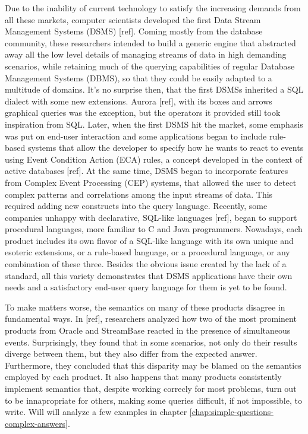 \documentclass{report}
\begin{document}
Due to the inability of current technology to satisfy the increasing
demands from all these markets, computer scientists developed the
first Data Stream Management Systems (DSMS) [ref]. Coming mostly from
the database community, these researchers intended to build a generic
engine that abstracted away all the low level details of managing
streams of data in high demanding scenarios, while retaining much of
the querying capabilities of regular Database Management Systems
(DBMS), so that they could be easily adapted to a multitude of
domains. It's no surprise then, that the first DSMSs inherited a SQL
dialect with some new extensions. Aurora [ref], with its boxes and
arrows graphical queries was the exception, but the operators it
provided still took inspiration from SQL. Later, when the first DSMS
hit the market, some emphasis was put on end-user interaction and some
applications began to include rule-based systems that allow the
developer to specify how he wants to react to events using Event
Condition Action (ECA) rules, a concept developed in the context of
active databases [ref]. At the same time, DSMS began to incorporate
features from Complex Event Processing (CEP) systems, that allowed the
user to detect complex patterns and correlations among the input
streams of data. This required adding new constructs into the query
language. Recently, some companies unhappy with declarative, SQL-like
languages [ref], began to support procedural languages, more familiar
to C and Java programmers. Nowadays, each product includes its own
flavor of a SQL-like language with its own unique and esoteric
extensions, or a rule-based language, or a procedural language, or any
combination of these three. Besides the obvious issue created by the
lack of a standard, all this variety demonstrates that DSMS
applications have their own needs and a satisfactory end-user query
language for them is yet to be found.

To make matters worse, the semantics on many of these products
disagree in fundamental ways. In [ref], researchers analyzed how two
of the most prominent products from Oracle and StreamBase reacted in
the presence of simultaneous events. Surprisingly, they found that in
some scenarios, not only do their results diverge between them, but
they also differ from the expected answer. Furthermore, they concluded
that this disparity may be blamed on the semantics employed by each
product. It also happens that many products consistently implement
semantics that, despite working correcly for most problems, turn out
to be innapropriate for others, making some queries difficult, if not
impossible, to write. Will will analyze a few examples in chapter
\ref{chap:simple-questions-complex-answers}.
\end{document}
